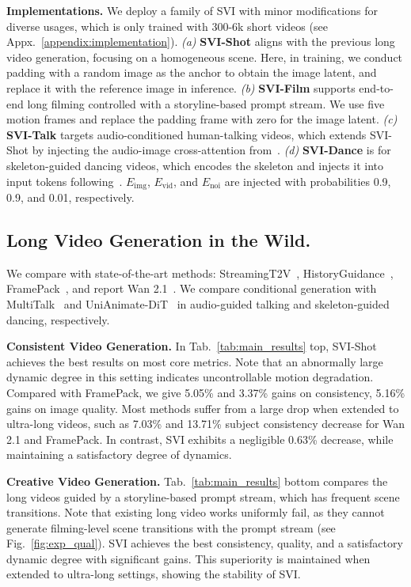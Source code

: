 \documentclass{article} %
\newcommand\vid{\mathrm{vid}}
\newcommand\noi{\mathrm{noi}}
\newcommand\img{\mathrm{img}}
\begin{document}
\vspace{-4pt}
\textbf{Implementations.} We deploy a family of SVI with minor modifications for diverse usages, which is only trained with 300-6k short videos (see Appx.~\ref{appendix:implementation}). \emph{(a)} \textbf{SVI-Shot} aligns with the previous long video generation, focusing on a homogeneous scene. Here, in training, we conduct padding with a random image as the anchor to obtain the image latent, and replace it with the reference image in inference. \emph{(b)} \textbf{SVI-Film} supports end-to-end long filming controlled with a storyline-based prompt stream. We use five motion frames and replace the padding frame with zero for the image latent. \emph{(c)} \textbf{SVI-Talk} targets audio-conditioned human-talking videos, which extends SVI-Shot by injecting the audio-image cross-attention from~\citep{kong2025let}. \emph{(d)} \textbf{SVI-Dance} is for skeleton-guided dancing videos, which encodes the skeleton and injects it into input tokens following~\citep{wang2025unianimate}. $E_\img$, $E_\vid$, and $E_\noi$ are injected with probabilities 0.9, 0.9, and 0.01, respectively. 


\subsection{Long Video Generation in the Wild.}
We compare with state-of-the-art methods: StreamingT2V~\citep{henschel2025streamingt2v}, HistoryGuidance~\citep{songhistory}, FramePack~\citep{zhang2025packing}, and report Wan 2.1~\citep{wang2025wan}. We compare conditional generation with MultiTalk~\citep{kong2025let} and UniAnimate-DiT~\citep{wang2025unianimate} in audio-guided talking and skeleton-guided dancing, respectively.

\vspace{-2pt}\textbf{Consistent Video Generation.} In Tab.~\ref{tab:main_results} top, SVI-Shot achieves the best results on most core metrics. Note that an abnormally large dynamic degree in this setting indicates uncontrollable motion degradation. Compared with FramePack, we give 5.05\% and 3.37\% gains on consistency, 5.16\% gains on image quality. Most methods suffer from a large drop when extended to ultra-long videos, such as {7.03\% and 13.71\% subject consistency decrease} for Wan 2.1 and FramePack. In contrast, SVI exhibits a negligible 0.63\% decrease, while maintaining a satisfactory degree of dynamics.


\vspace{-2pt}\textbf{Creative Video Generation.} Tab.~\ref{tab:main_results} bottom compares the long videos guided by a storyline-based prompt stream, which has frequent scene transitions. Note that existing long video works uniformly fail, as they cannot generate filming-level scene transitions with the prompt stream (see Fig.~\ref{fig:exp_qual}). SVI achieves the best consistency, quality, and a satisfactory dynamic degree with significant gains. This superiority is maintained when extended to ultra-long settings, showing the stability of SVI. 
\end{document}
